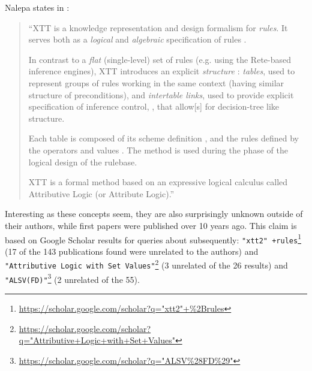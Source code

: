 Nalepa states in \cite{nalepa2008xtt2}:

\begin{quotation}
	``XTT is a knowledge representation and design formalism for \emph{rules}. It serves both as a \emph{logical} and \emph{algebraic} specification of rules \elide.
	
	In contrast to \elide a \emph{flat} (single-level) set of rules (e.g. using the Rete-based inference engines), XTT introduces an explicit \emph{structure} \elide: \emph{tables}, used to represent groups of rules working in the same context (having similar structure of preconditions), and \emph{intertable links}, used to provide explicit specification of inference control, \elide, that allow[s] for decision-tree like structure.
	
	Each table is composed of its scheme \elide definition \elide, and
	the rules defined by the operators and values \elide.
	The method is used during the phase of the logical design of the rulebase. \elide
	
	XTT is a formal method based on an expressive logical calculus called Attributive Logic (or Attribute Logic).''
\end{quotation}

Interesting as these concepts seem, they are also surprisingly unknown outside of their authors, while first papers were published over 10 years ago. This claim is based on Google Scholar results for queries about subsequently: \texttt{"xtt2"~+rules}\footnote{\url{https://scholar.google.com/scholar?q="xtt2"+\%2Brules}} (17 of the 143 publications found were unrelated to the authors) and \texttt{"Attributive Logic with Set Values"}\footnote{\url{https://scholar.google.com/scholar?q="Attributive+Logic+with+Set+Values"}} (3 unrelated of the 26 results) and \texttt{"ALSV(FD)"}\footnote{\url{https://scholar.google.com/scholar?q="ALSV\%28FD\%29"}} (2 unrelated of the 55).
